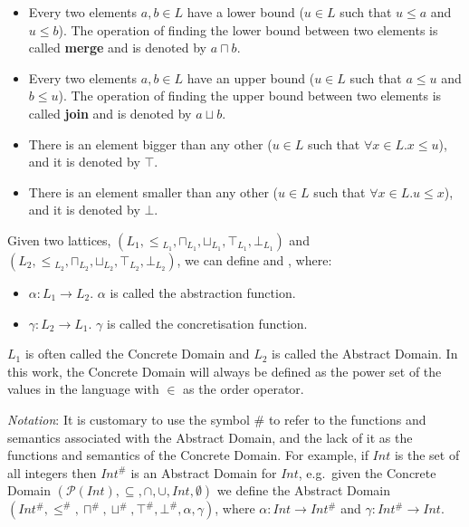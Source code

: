 \begin{itemize}
\tightlist
\item
  Every two elements \(a, b \in L\) have a lower bound (\(u \in L\) such
  that \(u \le a\) and \(u \le b\)). The operation of finding the lower
  bound between two elements is called \textbf{merge} and is denoted by
  \(a \sqcap b\).
\item
  Every two elements \(a, b \in L\) have an upper bound (\(u \in L\)
  such that \(a \le u\) and \(b \le u\)). The operation of finding the
  upper bound between two elements is called \textbf{join} and is
  denoted by \(a \sqcup b\).
\item
  There is an element bigger than any other (\(u \in L\) such that
  \(\forall x \in L . x \le u\)), and it is denoted by \(\top\).
\item
  There is an element smaller than any other (\(u \in L\) such that
  \(\forall x \in L . u \le x\)), and it is denoted by \(\bot\).
\end{itemize}

Given two lattices,
\((L_1, \le{}_{L_1}, \sqcap{}_{L_1}, \sqcup{}_{L_1}, \top{}_{L_1}, \bot{}_{L_1})\)
and
\((L{}_2, \le{}_{L_2}, \sqcap{}_{L_2}, \sqcup{}_{L_2}, \top{}_{L_2}, \bot{}_{L_2})\),
 we can define \alpha and \gamma, where:

\begin{itemize}
\tightlist
\item \(\alpha : L_1 \rightarrow L_2\). \(\alpha\) is called the abstraction function.
\item \(\gamma : L_2 \rightarrow L_1\). \(\gamma\) is called the concretisation function.
\end{itemize}

\(L_1\) is often called the Concrete Domain and \(L_2\) is called the Abstract Domain. In
this work, the Concrete Domain will always be defined as the power set of the values in
the language with \(\in\) as the order operator.

\emph{Notation}: It is customary to use the symbol \(\#\) to refer to
the functions and semantics associated with the Abstract Domain, and the
lack of it as the functions and semantics of the Concrete Domain. For
example, if \(Int\) is the set of all integers then \(Int^{\#}\) is an
Abstract Domain for \(Int\), e.g.~given the Concrete Domain
\((\mathcal{P}(Int), \subseteq, \cap, \cup, Int, \emptyset)\) we define
the Abstract Domain
\((Int^{\#}, \le^{\#}, \sqcap^{\#}, \sqcup^{\#}, \top^{\#}, \bot^{\#}, \alpha, \gamma)\),
where \(\alpha : Int \rightarrow Int^{\#}\) and
\(\gamma : Int^{\#} \rightarrow Int\).

